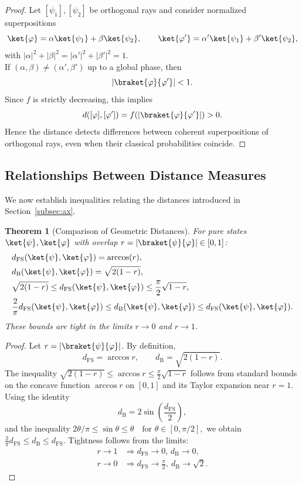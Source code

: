\documentclass[aps,pra,reprint,nofootinbib,showpacs,superscriptaddress]{revtex4-1}
\newtheorem{theorem}{Theorem}[section]
\begin{document}
\begin{proof}
Let $[\psi_1],[\psi_2]$ be orthogonal rays and consider
normalized superpositions
\[
\ket{\varphi} = \alpha \ket{\psi_1} + \beta \ket{\psi_2},
\qquad
\ket{\varphi'} = \alpha' \ket{\psi_1} + \beta' \ket{\psi_2},
\]
with $|\alpha|^2 + |\beta|^2 = |\alpha'|^2 + |\beta'|^2 = 1$.\\
If $(\alpha,\beta) \neq (\alpha',\beta')$ up to a global phase,
then
\[
|\braket{\varphi}{\varphi'}| < 1.
\]
Since $f$ is strictly decreasing, this implies
\[
d([\varphi],[\varphi']) = f(|\braket{\varphi}{\varphi'}|) > 0.
\]
Hence the distance detects differences between coherent superpositions
of orthogonal rays, even when their classical probabilities coincide.
\end{proof}

\subsection{Relationships Between Distance Measures}
We now establish inequalities relating the distances introduced in Section~\ref{subsec:ax}.
\begin{theorem}[Comparison of Geometric Distances]
\label{thm:geometric-comparison}
For pure states $\ket{\psi},\ket{\varphi}$ with overlap 
$r = |\braket{\psi}{\varphi}| \in [0,1]$:
\begin{align*}
&d_{\mathrm{FS}}(\ket{\psi},\ket{\varphi}) = \arccos(r),\\
&d_{\mathrm{B}}(\ket{\psi},\ket{\varphi}) = \sqrt{2(1-r)},\\
&\sqrt{2(1-r)} \le d_{\mathrm{FS}}(\ket{\psi},\ket{\varphi}) 
\le \frac{\pi}{2}\sqrt{1-r},\\
&\frac{2}{\pi} d_{\mathrm{FS}}(\ket{\psi},\ket{\varphi}) 
\le d_{\mathrm{B}}(\ket{\psi},\ket{\varphi}) 
\le d_{\mathrm{FS}}(\ket{\psi},\ket{\varphi}).
\end{align*}
These bounds are tight in the limits $r \to 0$ and $r \to 1$.
\end{theorem}

\begin{proof}
Let $r = |\braket{\psi}{\varphi}|$. By definition,
\[
d_{\mathrm{FS}} = \arccos r,
\qquad
d_{\mathrm{B}} = \sqrt{2(1-r)}.
\]
The inequality
\(
\sqrt{2(1-r)} \le \arccos r 
\le \frac{\pi}{2}\sqrt{1-r}
\)
follows from standard bounds on the concave function $\arccos r$ 
on $[0,1]$ and its Taylor expansion near $r=1$.\\
Using the identity
\[
d_{\mathrm{B}} = 2\sin\left(\frac{d_{\mathrm{FS}}}{2}\right),
\]
and the inequality
\(
2\theta/\pi  \le \sin\theta \le \theta
\quad \text{for } \theta\in[0,\pi/2],
\)
we obtain
\(
\frac{2}{\pi} d_{\mathrm{FS}} 
\le d_{\mathrm{B}} 
\le d_{\mathrm{FS}}.
\) Tightness follows from the limits:
\begin{align*}
r\to1 &\Rightarrow d_{\mathrm{FS}}\to 0, \,d_{\mathrm{B}}\to0,\\
r\to0 &\Rightarrow d_{\mathrm{FS}}\to \frac{\pi}{2},\ 
d_{\mathrm{B}}\to \sqrt{2}.  
\end{align*}
\end{proof}
\end{document}
